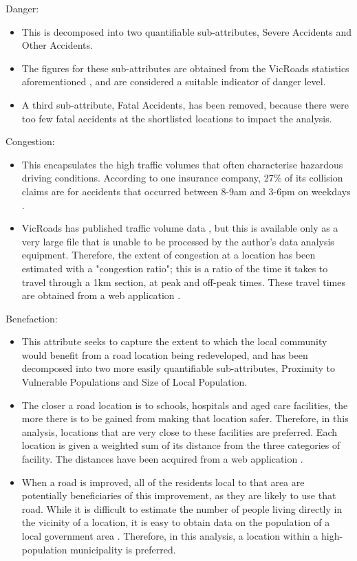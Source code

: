 \documentclass[11pt, a4paper]{article}
\begin{document}
    \hfill \break
    Danger:
    \begin{itemize}
        \item This is decomposed into two quantifiable sub-attributes, Severe Accidents and Other Accidents.
        \item The figures for these sub-attributes are obtained from the VicRoads statistics aforementioned \parencite{a3}, and are considered a suitable indicator of danger level.
        \item A third sub-attribute, Fatal Accidents, has been removed, because there were too few fatal accidents at the shortlisted locations to impact the analysis. 
    \end{itemize}

    \hfill \break
    Congestion:
    \begin{itemize}
        \item This encapsulates the high traffic volumes that often characterise hazardous driving conditions. According to one insurance company, 27\% of its collision claims are for accidents that occurred between 8-9am and 3-6pm on weekdays \parencite{a15}.
        \item VicRoads has published traffic volume data \parencite{a16}, but this is available only as a very large file that is unable to be processed by the author's data analysis equipment. Therefore, the extent of congestion at a location has been estimated with a "congestion ratio"; this is a ratio of the time it takes to travel through a 1km section, at peak and off-peak times. These travel times are obtained from a web application \parencite{a17}.
    \end{itemize}

    \hfill \break
    Benefaction:
    \begin{itemize}
        \item This attribute seeks to capture the extent to which the local community would benefit from a road location being redeveloped, and has been decomposed into two more easily quantifiable sub-attributes, Proximity to Vulnerable Populations and Size of Local Population.
        \item The closer a road location is to schools, hospitals and aged care facilities, the more there is to be gained from making that location safer. Therefore, in this analysis, locations that are very close to these facilities are preferred. Each location is given a weighted sum of its distance from the three categories of facility. The distances have been acquired from a web application \parencite{a17}.
        \item When a road is improved, all of the residents local to that area are potentially beneficiaries of this improvement, as they are likely to use that road. While it is difficult to estimate the number of people living directly in the vicinity of a location, it is easy to obtain data on the population of a local government area \parencite{a18}. Therefore, in this analysis, a location within a high-population municipality is preferred.
    \end{itemize}
\end{document}
